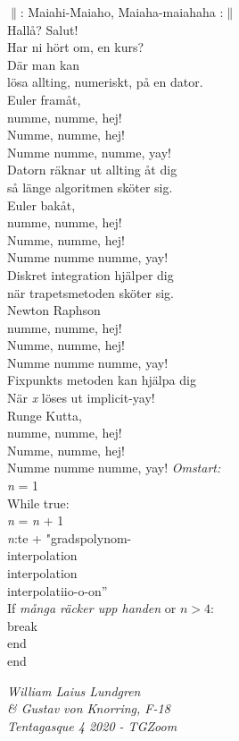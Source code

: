 \documentclass[a6paper,10pt]{article}
\begin{document}
\begin{center}
\end{center}
\small $\|$: Maiahi-Maiaho, Maiaha-maiahaha :$\|$
\vspace{5pt}\\
Hallå? Salut!\\
Har ni hört om, en kurs?\\
Där man kan\\
lösa allting, numeriskt, på en dator.
\vspace{5pt}\\
Euler framåt,\\
numme, numme, hej!\\
Numme, numme, hej!\\
Numme numme, numme, yay!\\
Datorn räknar ut allting åt dig\\
så länge algoritmen sköter sig.
\vspace{5pt}\\
Euler bakåt,\\
numme, numme, hej!\\
Numme, numme, hej!\\
Numme numme numme, yay!\\
Diskret integration hjälper dig\\
när trapetsmetoden sköter sig.
\vspace{5pt}\\
Newton Raphson\\
numme, numme, hej!\\
Numme, numme, hej!\\
Numme numme numme, yay!\\
Fixpunkts metoden kan hjälpa dig\\
När \textit{x} löses ut implicit-yay!
\vspace{5pt}\\
Runge Kutta,\\
numme, numme, hej!\\
Numme, numme, hej!\\
Numme numme numme, yay!
\setlength{\oddsidemargin}{-0.47in}
\noindent
\textit{Omstart:}
\vspace{3pt}\\
\textit{n} = 1\\
While true:\\
\indent
    \textit{n} = \textit{n} + 1\\
    \indent \textit{n}:te + "gradspolynom-\\
    \indent interpolation\\
    \indent interpolation\\
    \indent interpolatiio-o-on”\\
    \indent If \textit{många räcker upp handen} or $n>4$:\\
    \indent \indent break\\
    \indent end\\
end
    


\begin{flushright}
\textit{William Laius Lundgren\\ \& Gustav von Knorring, F-18\\Tentagasque 4 2020 - TGZoom}
\end{flushright}
\end{document}
